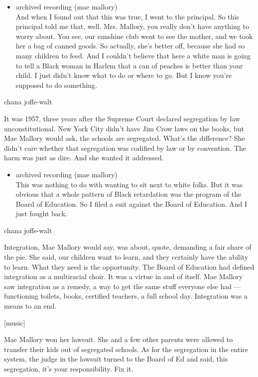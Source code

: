 \begin{itemize}
\tightlist
\item
  archived recording (mae mallory)\\
  And when I found out that this was true, I went to the principal. So
  this principal told me that, well, Mrs. Mallory, you really don't have
  anything to worry about. You see, our sunshine club went to see the
  mother, and we took her a bag of canned goods. So actually, she's
  better off, because she had so many children to feed. And I couldn't
  believe that here a white man is going to tell a Black woman in Harlem
  that a can of peaches is better than your child. I just didn't know
  what to do or where to go. But I know you're supposed to do something.
\end{itemize}

chana joffe-walt

It was 1957, three years after the Supreme Court declared segregation by
law unconstitutional. New York City didn't have Jim Crow laws on the
books, but Mae Mallory would ask, the schools are segregated. What's the
difference? She didn't care whether that segregation was codified by law
or by convention. The harm was just as dire. And she wanted it
addressed.

\begin{itemize}
\tightlist
\item
  archived recording (mae mallory)\\
  This was nothing to do with wanting to sit next to white folks. But it
  was obvious that a whole pattern of Black retardation was the program
  of the Board of Education. So I filed a suit against the Board of
  Education. And I just fought back.
\end{itemize}

chana joffe-walt

Integration, Mae Mallory would say, was about, quote, demanding a fair
share of the pie. She said, our children want to learn, and they
certainly have the ability to learn. What they need is the opportunity.
The Board of Education had defined integration as a multiracial choir.
It was a virtue in and of itself. Mae Mallory saw integration as a
remedy, a way to get the same stuff everyone else had --- functioning
toilets, books, certified teachers, a full school day. Integration was a
means to an end.

{[}music{]}

Mae Mallory won her lawsuit. She and a few other parents were allowed to
transfer their kids out of segregated schools. As for the segregation in
the entire system, the judge in the lawsuit turned to the Board of Ed
and said, this segregation, it's your responsibility. Fix it.

